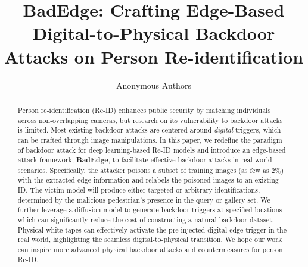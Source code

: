 \documentclass[sigconf,authordraft]{acmart}
\begin{document}
\title{BadEdge: Crafting Edge-Based Digital-to-Physical Backdoor Attacks on Person Re-identification}


\author{Anonymous Authors}


\begin{abstract}
  Person re-identification (Re-ID) enhances public security by matching individuals across non-overlapping cameras, but research on its vulnerability to backdoor attacks is limited. Most existing backdoor attacks are centered around \emph{digital} triggers, which can be crafted through image manipulations. In this paper, we redefine the paradigm of backdoor attack for deep learning-based Re-ID models and introduce an edge-based attack framework, \textbf{BadEdge}, to facilitate effective backdoor attacks in real-world scenarios. Specifically, the attacker poisons a subset of training images (as few as 2$\%$) with the extracted edge information and relabels the poisoned images to an existing ID. The victim model will produce either targeted or arbitrary identifications, determined by the malicious pedestrian's presence in the query or gallery set. We further leverage a diffusion model to generate backdoor triggers at specified locations which can significantly reduce the cost of constructing a natural backdoor dataset. Physical white tapes can effectively activate the pre-injected digital edge trigger in the real world, highlighting the seamless digital-to-physical transition. We hope our work can inspire more advanced physical backdoor attacks and countermeasures for person Re-ID.
\end{abstract}
\end{document}
